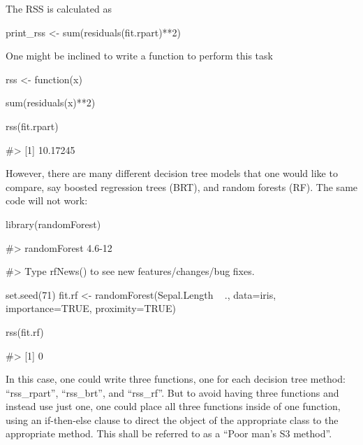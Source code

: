 The RSS is calculated as

\begin{Schunk}
\begin{Sinput}
print_rss <- sum(residuals(fit.rpart)**2)
\end{Sinput}
\end{Schunk}

One might be inclined to write a function to perform this task

\begin{Schunk}
\begin{Sinput}
rss <- function(x){
  
  sum(residuals(x)**2)
  
}

rss(fit.rpart)
\end{Sinput}
\begin{Soutput}
#> [1] 10.17245
\end{Soutput}
\end{Schunk}

However, there are many different decision tree models that one would
like to compare, say boosted regression trees (BRT), and random forests
(RF). The same code will not work:

\begin{Schunk}
\begin{Sinput}
library(randomForest)
\end{Sinput}
\begin{Soutput}
#> randomForest 4.6-12
\end{Soutput}
\begin{Soutput}
#> Type rfNews() to see new features/changes/bug fixes.
\end{Soutput}
\begin{Sinput}
set.seed(71)
fit.rf <- randomForest(Sepal.Length ~ ., data=iris, importance=TRUE,
                        proximity=TRUE)

rss(fit.rf)
\end{Sinput}
\begin{Soutput}
#> [1] 0
\end{Soutput}
\end{Schunk}

In this case, one could write three functions, one for each decision
tree method: ``rss\_rpart'', ``rss\_brt'', and ``rss\_rf''. But to avoid
having three functions and instead use just one, one could place all
three functions inside of one function, using an if-then-else clause to
direct the object of the appropriate class to the appropriate method.
This shall be referred to as a ``Poor man's S3 method''.

